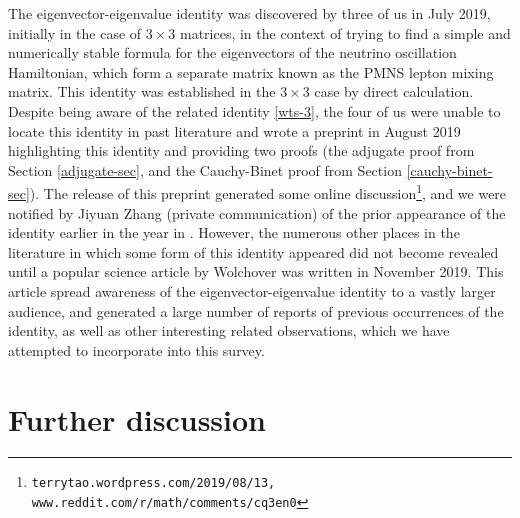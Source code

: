 \documentclass{amsart}
\begin{document}
The eigenvector-eigenvalue identity was discovered by three of us \cite{Denton:2019ovn} in July 2019, initially in the case of $3 \times 3$ matrices, in the context of trying to find a simple and numerically stable formula for the eigenvectors of the neutrino oscillation Hamiltonian, which form a separate matrix known as the PMNS lepton mixing matrix.  	This identity was established in the $3 \times 3$ case by direct calculation.  Despite being aware of the related identity \eqref{wts-3}, the four of us were unable to locate this identity in past literature and wrote a preprint \cite{DPTZ} in August 2019 highlighting this identity and providing two proofs (the adjugate proof from Section \ref{adjugate-sec}, and the Cauchy-Binet proof from Section \ref{cauchy-binet-sec}).  The release of this preprint generated some online discussion\footnote{\tt terrytao.wordpress.com/2019/08/13, www.reddit.com/r/math/comments/cq3en0}, and we were notified by Jiyuan Zhang (private communication) of the prior appearance of the identity earlier in the year in \cite{2019arXiv190505314F}.  However, the numerous other places in the literature in which some form of this identity appeared did not become revealed until a popular science article \cite{wolchover-2019} by Wolchover was written in November 2019.  This article spread awareness of the eigenvector-eigenvalue identity to a vastly larger audience, and generated a large number of reports of previous occurrences of the identity, as well as other interesting related observations, which we have attempted to incorporate into this survey.  


\section{Further discussion}
\end{document}

